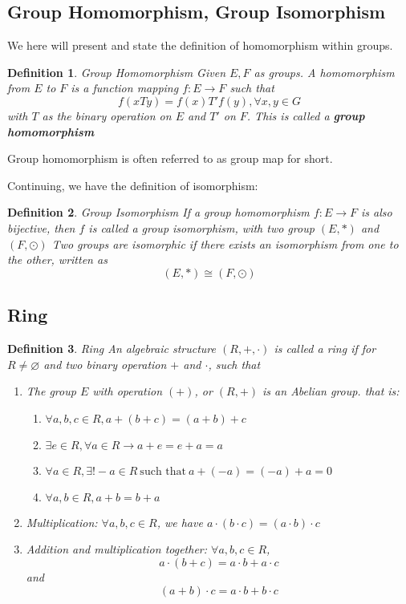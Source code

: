 \documentclass{book}
\newtheorem{Definition}{Definition}[section]
\numberwithin{identity}{subsection}
\numberwithin{Rule}{subsection}
\numberwithin{Theorem}{subsection}
\numberwithin{Definition}{subsection}
\begin{document}
\subsection{Group Homomorphism, Group Isomorphism}
We here will present and state the definition of homomorphism within groups. 

\begin{Definition}
    Group Homomorphism 
 Given $E,F$ as groups. A homomorphism from $E$ to $F$ is a function mapping $f:E\longrightarrow F$ such that $$f(xTy)=f(x)T'f(y),\forall x,y \in G$$ with $T$ as the binary operation on $E$ and $T'$ on $F$. This is called a \textbf{group homomorphism}
\end{Definition}

Group homomorphism is often referred to as group map for short. 

\vspace{5mm}

Continuing, we have the definition of isomorphism:
\begin{Definition}
    Group Isomorphism 
 If a group homomorphism $f: E \longrightarrow F$ is also bijective, then $f$ is called a group isomorphism, with two group $(E,*)$ and $(F,\odot)$ Two groups are isomorphic if there exists an isomorphism from one to the other, written as $$(E,*)\cong (F,\odot)$$
\end{Definition}

\subsection{Ring}

\begin{Definition}
    Ring 
    An algebraic structure $(R,+,\cdot)$ is called a ring if for $R\neq \varnothing$ and two binary operation $+$ and $\cdot$, such that 
    \begin{enumerate}
        \item The group $E$ with operation $(+)$, or $(R,+)$ is an Abelian group. that is:
        \begin{enumerate}
            \item $\forall a,b,c\in R, a+(b+c)=(a+b)+c$
            \item $\exists e\in R,\forall a \in R \rightarrow a+e=e+a=a$
            \item $\forall a \in R, \exists! -a \in R\:\text{such that}\:a+(-a)=(-a)+a=0$
            \item $\forall a,b \in R, a+b=b+a$
        \end{enumerate}
        \item Multiplication: $\forall a,b,c\in R$, we have $a\cdot(b\cdot c)=(a\cdot b)\cdot c$
        \item Addition and multiplication together: $\forall a,b,c \in R$, $$a\cdot (b+c)=a\cdot b + a \cdot c$$ and $$(a+b)\cdot c=a\cdot b+ b\cdot c$$
    \end{enumerate}
\end{Definition}
\end{document}
